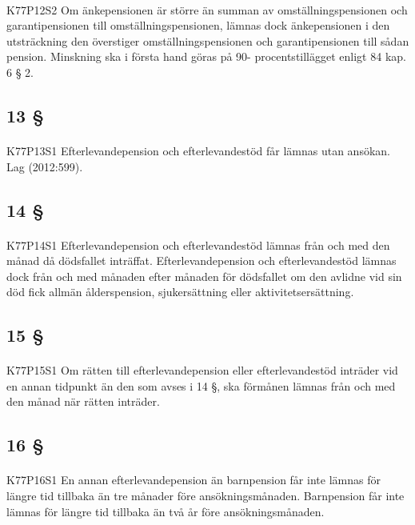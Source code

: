 \documentclass[a4paper,notitlepage,openany,10pt]{book}
\begin{document}
\paragraph*{}
{\tiny K77P12S2}
Om änkepensionen är större än summan av omställningspensionen och garantipensionen till omställningspensionen, lämnas dock änkepensionen i den utsträckning den överstiger omställningspensionen och garantipensionen till sådan pension. Minskning ska i första hand göras på 90- procentstillägget enligt 84 kap. 6 § 2.
\subsection*{13 §}
\paragraph*{}
{\tiny K77P13S1}
Efterlevandepension och efterlevandestöd får lämnas utan ansökan.
Lag (2012:599).
\subsection*{14 §}
\paragraph*{}
{\tiny K77P14S1}
Efterlevandepension och efterlevandestöd lämnas från och med den månad då dödsfallet inträffat. Efterlevandepension och efterlevandestöd lämnas dock från och med månaden efter månaden för dödsfallet om den avlidne vid sin död fick allmän ålderspension, sjukersättning eller aktivitetsersättning.
\subsection*{15 §}
\paragraph*{}
{\tiny K77P15S1}
Om rätten till efterlevandepension eller efterlevandestöd inträder vid en annan tidpunkt än den som avses i 14 §, ska förmånen lämnas från och med den månad när rätten inträder.
\subsection*{16 §}
\paragraph*{}
{\tiny K77P16S1}
En annan efterlevandepension än barnpension får inte lämnas för längre tid tillbaka än tre månader före ansökningsmånaden. Barnpension får inte lämnas för längre tid tillbaka än två år före ansökningsmånaden.
\end{document}
